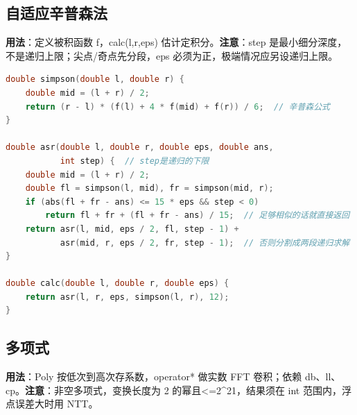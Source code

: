 \documentclass[a4paper,9pt]{extarticle}
\begin{document}
\subsection{自适应辛普森法}

\textbf{用法}：定义被积函数 f，calc(\allowbreak{}l,\allowbreak{}r,\allowbreak{}eps) 估计定积分。\textbf{注意}：step 是最小细分深度，不是递归上限；尖点/奇点先分段，eps 必须为正，极端情况应另设递归上限。

\begin{lstlisting}[language={C++}]
double simpson(double l, double r) {
    double mid = (l + r) / 2;
    return (r - l) * (f(l) + 4 * f(mid) + f(r)) / 6;  // 辛普森公式
}

double asr(double l, double r, double eps, double ans,
           int step) {  // step是递归的下限
    double mid = (l + r) / 2;
    double fl = simpson(l, mid), fr = simpson(mid, r);
    if (abs(fl + fr - ans) <= 15 * eps && step < 0)
        return fl + fr + (fl + fr - ans) / 15;  // 足够相似的话就直接返回
    return asr(l, mid, eps / 2, fl, step - 1) +
           asr(mid, r, eps / 2, fr, step - 1);  // 否则分割成两段递归求解
}

double calc(double l, double r, double eps) {
    return asr(l, r, eps, simpson(l, r), 12);
}
\end{lstlisting}

\subsection{多项式}

\textbf{用法}：Poly 按低次到高次存系数，operator* 做实数 FFT 卷积；依赖 db、ll、cp。\textbf{注意}：非空多项式，变换长度为 2 的幂且<\allowbreak{}=\allowbreak{}2\textasciicircum{}21，结果须在 int 范围内，浮点误差大时用 NTT。
\end{document}
